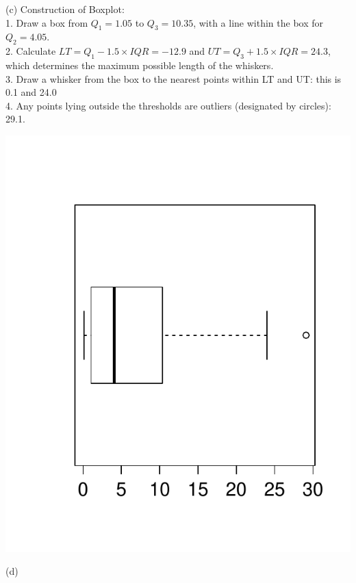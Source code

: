 \documentclass[bigtut]{tutorial}\usepackage[]{graphicx}\usepackage[]{color}
\begin{document}
\begin{tutorial}
\begin{questions}
\begin{solution}
(c) 
Construction of Boxplot: \\
1. Draw a box from $Q_{1}=1.05$ to $Q_{3}=10.35$, with a line within the box for $Q_{2}=4.05$. \\
2. Calculate $LT=Q_{1}-1.5 \times IQR=-12.9$ and $UT=Q_{3}+ 1.5 \times IQR=24.3$, which determines the maximum possible length of the whiskers. \\
3. Draw a whisker from the box to the nearest points within LT and UT: this is 0.1 and 24.0 \\
4. Any points lying outside the thresholds are outliers (designated by circles): 29.1.

\includegraphics[scale=0.5]{Week3-Q2}

(d) 


\end{solution}
\end{questions}
\end{tutorial}
\end{document}
